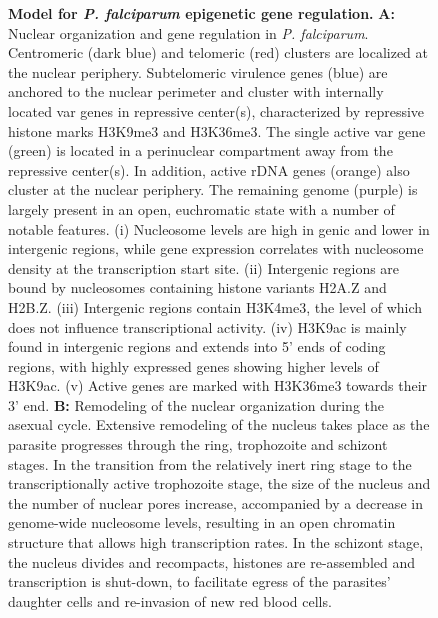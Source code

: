 \begin{figure}
\begin{center}
\end{center}
\caption{\textbf{Model for \textit{P. falciparum} epigenetic gene regulation.}
 \textbf{A:} Nuclear organization and gene regulation in \textit{P. falciparum}. Centromeric
 (dark blue) and telomeric (red) clusters are localized at the nuclear
 periphery. Subtelomeric virulence genes (blue) are anchored to the nuclear
 perimeter and cluster with internally located var genes in repressive
 center(s), characterized by repressive histone marks H3K9me3 and H3K36me3.
 The single active var gene (green) is located in a perinuclear compartment
 away from the repressive center(s). In addition, active rDNA genes (orange)
 also cluster at the nuclear periphery. The remaining genome (purple) is
 largely present in an open, euchromatic state with a number of notable
 features. (i) Nucleosome levels are high in genic and lower in intergenic
 regions, while gene expression correlates with nucleosome density at the
 transcription start site. (ii) Intergenic regions are bound by nucleosomes
 containing histone variants H2A.Z and H2B.Z. (iii) Intergenic regions contain
 H3K4me3, the level of which does not influence transcriptional activity. (iv)
 H3K9ac is mainly found in intergenic regions and extends into 5’ ends of
 coding regions, with highly expressed genes showing higher levels of H3K9ac.
 (v) Active genes are marked with H3K36me3 towards their 3’ end. \textbf{B:}
 Remodeling
 of the nuclear organization during the asexual cycle. Extensive remodeling of
 the nucleus takes place as the parasite progresses through the ring,
 trophozoite and schizont stages. In the transition from the relatively inert
 ring stage to the transcriptionally active trophozoite stage, the size of the
 nucleus and the number of nuclear pores increase, accompanied by a decrease
 in genome-wide nucleosome levels, resulting in an open chromatin structure
 that allows high transcription rates. In the schizont stage, the nucleus
 divides and recompacts, histones are re-assembled and transcription is
 shut-down, to facilitate egress of the parasites’ daughter cells and
 re-invasion of new red blood cells.}
\label{fig:final}
\end{figure}

